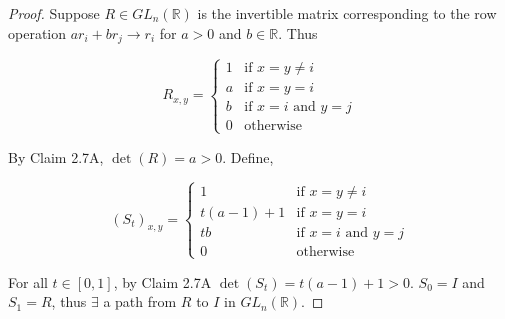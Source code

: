 \documentclass{article}
\newcommand{\R}{\mathbb{R}}
\begin{document}
\begin{proof}
    Suppose $R \in GL_n(\R)$ is the invertible matrix corresponding to the row operation $ar_i + b r_j \to r_i$ for $a > 0$ and $b \in \R$. Thus 
        
        \[
            R_{x, y} = \begin{cases}
                1 & \text{if } x = y \neq i \\
                a & \text{if } x = y = i \\
                b & \text{if } x = i \text{ and } y = j \\
                0 & \text{otherwise}  
            \end{cases}
        \]

        By Claim 2.7A, $\det(R) = a > 0$. 
        Define, 
        
        \[(S_t)_{x, y} = \begin{cases}
            1 & \text{if } x = y \neq i \\
            t(a - 1) + 1 & \text{if } x = y = i \\
            tb & \text{if } x = i \text{ and } y = j \\
            0 & \text{otherwise}  
        \end{cases}\]

    For all $t \in [0, 1]$, by Claim 2.7A $\det(S_t) = t(a - 1) + 1 > 0$. $S_0 = I$ and $S_1 = R$, thus $\exists$ a path from $R$ to $I$ in $GL_n(\R)$.       
\end{proof}

\bigskip
\end{document}
